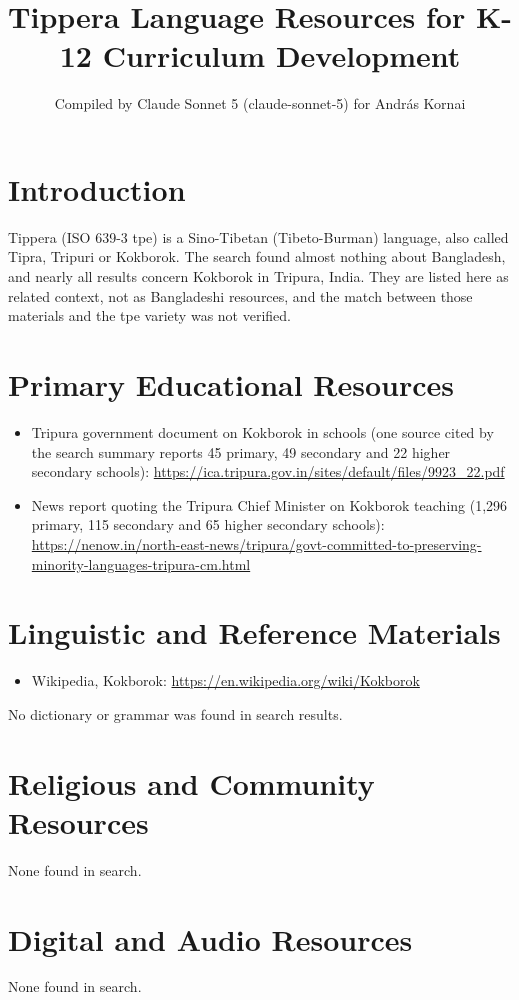\documentclass[12pt]{article}
\title{Tippera Language Resources for K-12 Curriculum Development}
\author{Compiled by Claude Sonnet 5 (claude-sonnet-5) for Andr\'as Kornai}
\date{}
\begin{document}
\maketitle

\section{Introduction}
Tippera (ISO 639-3 tpe) is a Sino-Tibetan (Tibeto-Burman) language, also called Tipra, Tripuri or Kokborok. The search found almost nothing about Bangladesh, and nearly all results concern Kokborok in Tripura, India. They are listed here as related context, not as Bangladeshi resources, and the match between those materials and the tpe variety was not verified.

\section{Primary Educational Resources}
\begin{itemize}
\item Tripura government document on Kokborok in schools (one source cited by the search summary reports 45 primary, 49 secondary and 22 higher secondary schools): \url{https://ica.tripura.gov.in/sites/default/files/9923_22.pdf}
\item News report quoting the Tripura Chief Minister on Kokborok teaching (1,296 primary, 115 secondary and 65 higher secondary schools): \url{https://nenow.in/north-east-news/tripura/govt-committed-to-preserving-minority-languages-tripura-cm.html}
\end{itemize}

\section{Linguistic and Reference Materials}
\begin{itemize}
\item Wikipedia, Kokborok: \url{https://en.wikipedia.org/wiki/Kokborok}
\end{itemize}
No dictionary or grammar was found in search results.

\section{Religious and Community Resources}
None found in search.

\section{Digital and Audio Resources}
None found in search.
\end{document}

